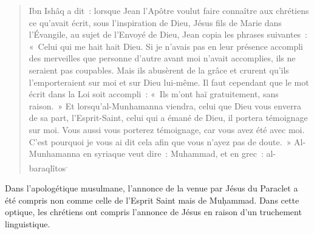 \begin{quotation}
    

Ibn Ishâq a dit~: lorsque Jean l'Apôtre voulut faire connaître aux
chrétiens ce qu'avait écrit, sous l'inspiration de Dieu, Jésus fils de
Marie dans l'Évangile, au sujet de l'Envoyé de Dieu, Jean copia les
phrases suivantes~: «~Celui qui me hait hait Dieu. Si je n'avais pas en
leur présence accompli des merveilles que personne d'autre avant moi
n'avait accomplies, ils ne seraient pas coupables. Mais ils abusèrent de
la grâce et crurent qu'ils l'emporteraient sur moi et sur Dieu lui-même.
Il faut cependant que le mot écrit dans la Loi soit accompli~: «~Ils
m'ont haï gratuitement, sans raison.~» Et lorsqu'al-Munhamanna viendra,
celui que Dieu vous enverra de sa part, l'Esprit-Saint, celui qui a
émané de Dieu, il portera témoignage sur moi. Vous aussi vous porterez
témoignage, car vous avez été avec moi. C'est pourquoi je vous ai dit
cela afin que vous n'ayez pas de doute.~» Al-Munhamanna en syriaque veut
dire~: Muhammad, et en grec~:
al-baraqlîtos\textsuperscript{.}
\end{quotation}
Dans l'apologétique musulmane, l'annonce de la venue par Jésus du
Paraclet a été compris non comme celle de l'Esprit Saint mais de
Muḥammad. Dans cette optique, les chrétiens ont compris l'annonce de
Jésus en raison d'un truchement linguistique.

